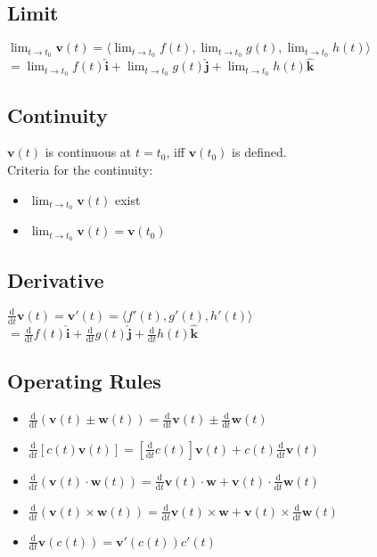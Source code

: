 \documentclass[UTF8,a4paper, 10pt, openany]{svmono}
\begin{document}
\subsection{Limit}
\begin{center}
$\displaystyle	\lim_{t \to t_0} \mathbf{v}(t) = \langle\displaystyle\lim_{t \to t_0}f(t),\displaystyle\lim_{t \to t_0}g(t),\displaystyle\lim_{t \to t_0}h(t)	\rangle$\\
$=\displaystyle\lim_{t \to t_0}f(t)\mathbf{\hat{i}}+\displaystyle\lim_{t \to t_0}g(t)\mathbf{\hat{j}}+\displaystyle\lim_{t \to t_0}h(t)\mathbf{\hat{k}}$
\end{center}

\subsection{Continuity}
$\mathbf{v}(t)$ is continuous at $t=t_0$, iff $\mathbf{v}(t_0)$ is defined.\\
Criteria for the continuity:
\begin{itemize}
\item $\displaystyle\lim_{t \to t_0} \mathbf{v}(t)$ exist
\item $\displaystyle\lim_{t \to t_0} \mathbf{v}(t)=\mathbf{v}(t_0)$
\end{itemize}

\subsection{Derivative}
\begin{center}
$\frac{\mathrm d}{\mathrm d t}\mathbf{v}(t)=\mathbf{v}'(t)=\langle f'(t),g'(t),h'(t) \rangle$\\
$=\frac{\mathrm d}{\mathrm d t}f(t)\mathbf{\hat{i}}+\frac{\mathrm d}{\mathrm d t}g(t)\mathbf{\hat{j}}+\frac{\mathrm d}{\mathrm d t}h(t)\mathbf{\hat{k}}$
\end{center}

\subsection{Operating Rules}
\begin{itemize}
\item $\frac{\mathrm d}{\mathrm d t}(\mathbf{v}(t)\pm \mathbf{w}(t))=\frac{\mathrm d}{\mathrm d t}\mathbf{v}(t)\pm \frac{\mathrm d}{\mathrm d t}\mathbf{w}(t)$
\item $\frac{\mathrm d}{\mathrm d t}[c(t)\mathbf{v}(t)]=[\frac{\mathrm d}{\mathrm d t}c(t)]\mathbf{v}(t)+c(t)\frac{\mathrm d}{\mathrm d t}\mathbf{v}(t)$
\item $\frac{\mathrm d}{\mathrm d t}(\mathbf{v}(t)\cdot \mathbf{w}(t))=\frac{\mathrm d}{\mathrm d t}\mathbf{v}(t)\cdot \mathbf{w}+\mathbf{v}(t)\cdot \frac{\mathrm d}{\mathrm d t}\mathbf{w}(t)$
\item $\frac{\mathrm d}{\mathrm d t}(\mathbf{v}(t)\times \mathbf{w}(t))=\frac{\mathrm d}{\mathrm d t}\mathbf{v}(t)\times \mathbf{w}+\mathbf{v}(t)\times \frac{\mathrm d}{\mathrm d t}\mathbf{w}(t)$
\item $\frac{\mathrm d}{\mathrm d t}\mathbf{v}(c(t))=\mathbf{v}'(c(t))c'(t)$
\end{itemize}
\end{document}
